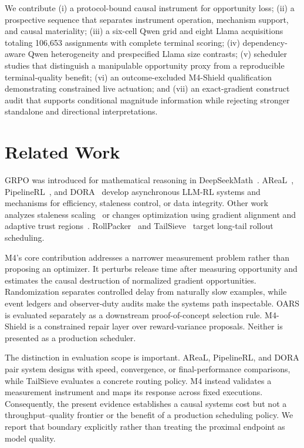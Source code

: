 \documentclass{article}
\begin{document}
We contribute (i) a protocol-bound causal instrument for opportunity loss; (ii) a prospective sequence that separates instrument operation, mechanism support, and causal materiality; (iii) a six-cell Qwen grid and eight Llama acquisitions totaling 106,653 assignments with complete terminal scoring; (iv) dependency-aware Qwen heterogeneity and prespecified Llama size contrasts; (v) scheduler studies that distinguish a manipulable opportunity proxy from a reproducible terminal-quality benefit; (vi) an outcome-excluded M4-Shield qualification demonstrating constrained live actuation; and (vii) an exact-gradient construct audit that supports conditional magnitude information while rejecting stronger standalone and directional interpretations.

\section{Related Work}
GRPO was introduced for mathematical reasoning in DeepSeekMath~\cite{shao2024deepseekmath}. AReaL~\cite{fu2025areal}, PipelineRL~\cite{piche2025pipelinerl}, and DORA~\cite{hu2026dora} develop asynchronous LLM-RL systems and mechanisms for efficiency, staleness control, or data integrity. Other work analyzes staleness scaling~\cite{song2026staleness} or changes optimization using gradient alignment and adaptive trust regions~\cite{xu2026gac,yang2026stale}. RollPacker~\cite{gao2025rollpacker} and TailSieve~\cite{xu2026tailsieve} target long-tail rollout scheduling.

M4's core contribution addresses a narrower measurement problem rather than proposing an optimizer. It perturbs release time after measuring opportunity and estimates the causal destruction of normalized gradient opportunities. Randomization separates controlled delay from naturally slow examples, while event ledgers and observer-duty audits make the systems path inspectable. OARS is evaluated separately as a downstream proof-of-concept selection rule. M4-Shield is a constrained repair layer over reward-variance proposals. Neither is presented as a production scheduler.

The distinction in evaluation scope is important. AReaL, PipelineRL, and DORA pair system designs with speed, convergence, or final-performance comparisons, while TailSieve evaluates a concrete routing policy. M4 instead validates a measurement instrument and maps its response across fixed executions. Consequently, the present evidence establishes a causal systems cost but not a throughput--quality frontier or the benefit of a production scheduling policy. We report that boundary explicitly rather than treating the proximal endpoint as model quality.
\end{document}
